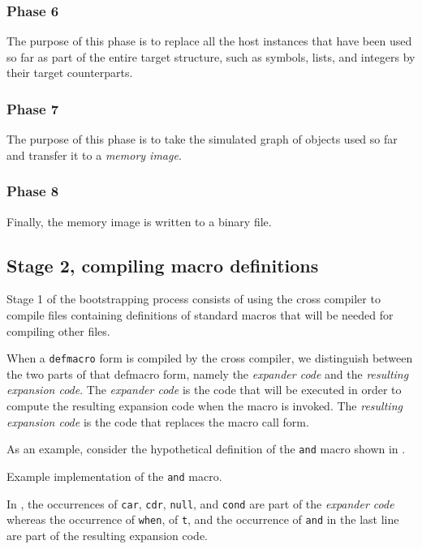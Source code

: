\subsubsection{Phase 6}

The purpose of this phase is to replace all the host instances that
have been used so far as part of the entire target structure, such as
symbols, lists, and integers by their target counterparts.

\subsubsection{Phase 7}

The purpose of this phase is to take the simulated graph of objects
used so far and transfer it to a \emph{memory image}.  

\subsubsection{Phase 8}

Finally, the memory image is written to a binary file. 


\subsection{Stage 2, compiling macro definitions}

Stage 1 of the bootstrapping process consists of using the cross
compiler to compile files containing definitions of standard macros
that will be needed for compiling other files. 

When a \texttt{defmacro} form is compiled by the cross compiler, we
distinguish between the two parts of that defmacro form, namely the
\emph{expander code} and the \emph{resulting expansion code}.  The
\emph{expander code} is the code that will be executed in order to
compute the resulting expansion code when the macro is invoked.  The
\emph{resulting expansion code} is the code that replaces the macro
call form. 

As an example, consider the hypothetical definition of the
\texttt{and} macro shown in .

\begin{codefragment}
\caption{\label{code-defmacro-and}
Example implementation of the \texttt{and} macro.}
\end{codefragment}

In , the occurrences of \texttt{car},
\texttt{cdr}, \texttt{null}, and \texttt{cond} are part of the
\emph{expander code} whereas the occurrence of \texttt{when}, of
\texttt{t}, and the occurrence of \texttt{and} in the last line are
part of the resulting expansion code. 

